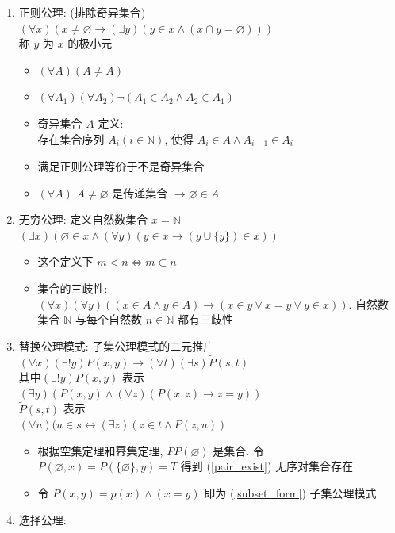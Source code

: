 \documentclass[11pt,a4paper,twocolumn,fleqn]{article} %
\renewcommand{\emptyset}{\varnothing}
\begin{document}
\begin{enumerate}
	\item 正则公理: (排除奇异集合)\\
	$(\forall x)(x\neq \emptyset \rightarrow 
	(\exists y)(y\in x\land (x\cap y = \emptyset)))$\\
	称 $y$ 为 $x$ 的极小元
	\begin{itemize}
		\item $(\forall A)(A\neq A)$
		\item $(\forall A_1)(\forall A_2)\lnot(A_1\in A_2 \land A_2 \in A_1)$
		\item 奇异集合 $A$ 定义: \\
		存在集合序列 $A_i (i\in\mathbb N)$, 使得 $A_i\in A \land A_{i+1}\in A_i$
		\item 满足正则公理等价于不是奇异集合
		\item $(\forall A)$ $A\neq\emptyset$ 是传递集合 
		$\rightarrow \emptyset\in A$
	\end{itemize}
	\item 无穷公理: 定义自然数集合 $x = \mathbb N$\\
	$(\exists x)(\emptyset\in x \land (\forall y)(y\in x \to 
	(y\cup \{y\})\in x))$
	\begin{itemize}
		\item 这个定义下 $m<n \Leftrightarrow m\subset n$
		\item 集合的三歧性: $(\forall x)(\forall y)((x\in A \land y\in A)
		\rightarrow (x\in y \lor x=y \lor y\in x))$. 自然数集合 $\mathbb N$ 
		与每个自然数 $n\in\mathbb N$ 都有三歧性
	\end{itemize}
	\item 替换公理模式: 子集公理模式的二元推广\\
	$(\forall x)(\exists ! y) P(x,y) \to (\forall t)(\exists s)\tilde P(s, t)$ \\
	其中$(\exists ! y) P(x,y)$ 表示\\
	$(\exists y) (P(x,y)\land (\forall z)(P(x,z)\to z=y))$\\
	$\tilde P(s, t)$ 表示 \\
	$ (\forall u)(u\in s \leftrightarrow (\exists z)(z \in t \land P(z, u))$
	\begin{itemize}
		\item 根据空集定理和幂集定理, $PP(\emptyset)$ 是集合. 令 $P(\emptyset,x)
		= P(\{\emptyset\}, y) = T$ 得到 (\ref{pair_exist}) 无序对集合存在
		\item 令 $P(x,y) = p(x)\land (x=y)$ 即为 (\ref{subset_form}) 子集公理模式
	\end{itemize}
	\item 选择公理: \\

\end{enumerate}
\end{document}
